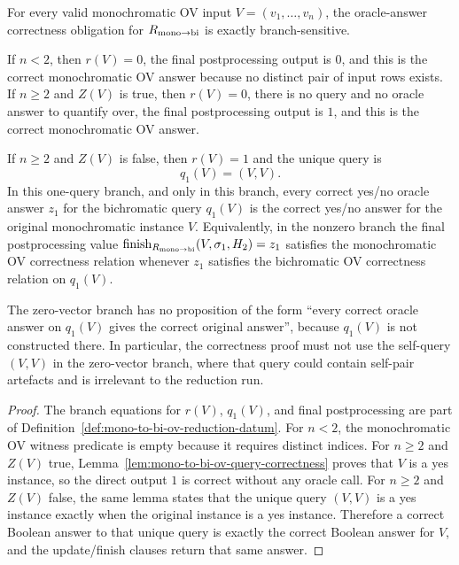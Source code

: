 \begin{lemma}
  \label{lem:mono-to-bi-ov-branch-answer-transfer}
  For every valid monochromatic OV input $V=(v_1,\ldots,v_n)$, the
  oracle-answer correctness obligation for $R_{\rm mono\to bi}$ is exactly
  branch-sensitive.

  If $n<2$, then $r(V)=0$, the final postprocessing output is $0$, and this is
  the correct monochromatic OV answer because no distinct pair of input rows
  exists.  If $n\geq2$ and $Z(V)$ is true, then $r(V)=0$, there is no query and
  no oracle answer to quantify over, the final postprocessing output is $1$,
  and this is the correct monochromatic OV answer.

  If $n\geq2$ and $Z(V)$ is false, then $r(V)=1$ and the unique query is
  \[
    q_1(V)=(V,V).
  \]
  In this one-query branch, and only in this branch, every correct yes/no
  oracle answer $z_1$ for the bichromatic query $q_1(V)$ is the correct
  yes/no answer for the original monochromatic instance $V$.  Equivalently,
  in the nonzero branch the final postprocessing value
  $\operatorname{finish}_{R_{\rm mono\to bi}}(V,\sigma_1,H_2)=z_1$ satisfies the
  monochromatic OV correctness relation whenever $z_1$ satisfies the
  bichromatic OV correctness relation on $q_1(V)$.

  The zero-vector branch has no proposition of the form ``every correct oracle
  answer on $q_1(V)$ gives the correct original answer'', because $q_1(V)$ is
  not constructed there.  In particular, the correctness proof must not use
  the self-query $(V,V)$ in the zero-vector branch, where that query could
  contain self-pair artefacts and is irrelevant to the reduction run.
\end{lemma}
\begin{proof}
  The branch equations for $r(V)$, $q_1(V)$, and final postprocessing are part
  of Definition~\ref{def:mono-to-bi-ov-reduction-datum}.  For $n<2$, the
  monochromatic OV witness predicate is empty because it requires distinct
  indices.  For $n\geq2$ and $Z(V)$ true,
  Lemma~\ref{lem:mono-to-bi-ov-query-correctness} proves that $V$ is a yes
  instance, so the direct output $1$ is correct without any oracle call.  For
  $n\geq2$ and $Z(V)$ false, the same lemma states that the unique query
  $(V,V)$ is a yes instance exactly when the original instance is a yes
  instance.  Therefore a correct Boolean answer to that unique query is exactly
  the correct Boolean answer for $V$, and the update/finish clauses return
  that same answer.
\end{proof}

